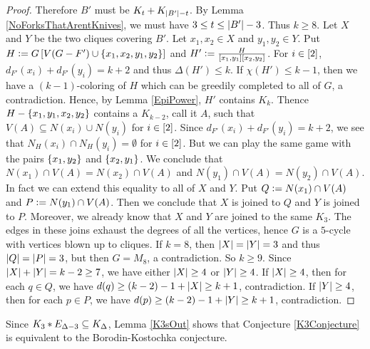 \begin{proof}
Therefore $B'$ must be $K_t \mbox{\hspace{2 pt}$+$\hspace{2 pt}} K_{\left|B'\right| - t}$.  
By Lemma \ref{NoForksThatArentKnives}, we must have $3 \leq t \leq \left|B'\right| -
3$.  Thus $k \geq 8$.  Let $X$ and $Y$ be the two cliques covering $B'$.  Let
$x_1, x_2 \in X$ and $y_1, y_2 \in Y$.  Put $H \mathrel{\mathop:}= G\left[ V(G-F')
\cup \left\{ x_1, x_2, y_1, y_2 \right\} \right]$ and $H' \mathrel{\mathop:}= \frac{H}{\left[ x_1,
y_1 \right]\left[ x_2,y_2 \right]}$.  For $i \in \left[2\right]$, $d_{F'}(x_i) + d_{F'}(y_i) =
k + 2$ and thus $\Delta(H') \leq k$. If $\chi(H') \leq k - 1$, then we have a
$(k-1)$-coloring of $H$ which can be greedily completed to all of $G$, a contradiction.  
Hence, by Lemma \ref{EpiPower}, $H'$ contains $K_k$.  Thence $H - \left\{ x_1,
y_1, x_2, y_2 \right\}$ contains a $K_{k-2}$, call it $A$, such that $V(A) \subseteq
N(x_i) \cup N(y_i)$ for $i \in \left[2\right]$.  
Since $d_{F'}(x_i)+d_{F'}(y_i)=k+2$, we see that
$N_H(x_i) \cap N_H(y_i) = \emptyset$ for $i \in \left[2\right]$.  But we can play
the same game with the pairs $\left\{ x_1, y_2 \right\}$ and $\left\{ x_2, y_1 \right\}$.  We conclude
that $N(x_1) \cap V(A) = N(x_2) \cap V(A)$ and $N(y_1) \cap V(A) = N(y_2) \cap
V(A)$.  In fact we can extend this equality to all of $X$ and $Y$.  Put $Q
\mathrel{\mathop:}= N(x_1) \cap V(A)$ and $P \mathrel{\mathop:}= N(y_1) \cap V(A)$.  Then we
conclude that $X$ is joined to $Q$ and $Y$ is joined to $P$.  Moreover, we
already know that $X$ and $Y$ are joined to the same $K_3$.  The edges in these
joins exhaust the degrees of all the vertices, hence $G$ is a $5$-cycle with
vertices blown up to cliques.  If $k = 8$, then $\left|X\right| = \left|Y\right| = 3$ and
thus $\left|Q\right| = \left|P\right| = 3$, but then $G = M_8$, a contradiction.  So $k
\geq 9$.  Since $\left|X\right|+\left|Y\right|= k-2 \ge 7$, we have either $\left|X\right|\ge 4$
or $\left|Y\right|\ge 4$.
If $\left|X\right|\ge 4$, then for each $q\in Q$, we have $d(q)\ge
(k-2)-1+\left|X\right|\ge k+1$, contradiction.  If $\left|Y\right|\ge 4$, then for each
$p\in P$, we have $d(p)\ge (k-2)-1+\left|Y\right|\ge k+1$, contradiction.
\end{proof}

Since $K_3 \mbox{\hspace{2 pt}$\ast$\hspace{2 pt}} E_{\Delta-3} \subseteq K_\Delta$, Lemma \ref{K3sOut} shows
that Conjecture \ref{K3Conjecture} is equivalent to the Borodin-Kostochka
conjecture.

